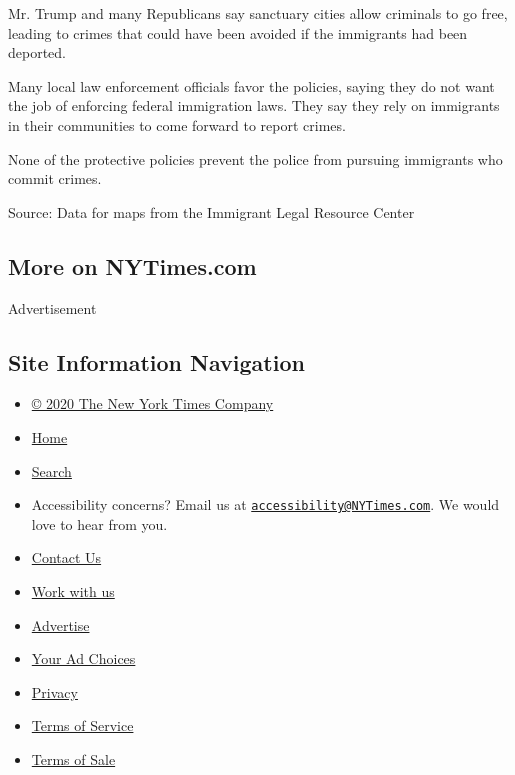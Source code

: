 Mr. Trump and many Republicans say sanctuary cities allow criminals to
go free, leading to crimes that could have been avoided if the
immigrants had been deported.

Many local law enforcement officials favor the policies, saying they do
not want the job of enforcing federal immigration laws. They say they
rely on immigrants in their communities to come forward to report
crimes.

None of the protective policies prevent the police from pursuing
immigrants who commit crimes.

Source: Data for maps from the Immigrant Legal Resource Center

\hypertarget{more-on-nytimescom}{%
\subsection{More on NYTimes.com}\label{more-on-nytimescom}}

Advertisement

\hypertarget{site-information-navigation}{%
\subsection{Site Information
Navigation}\label{site-information-navigation}}

\begin{itemize}
\tightlist
\item
  \href{https://help.nytimes3xbfgragh.onion/hc/en-us/articles/115014792127-Copyright-notice}{©
  2020 The New York Times Company}
\item
  \href{https://www.nytimes3xbfgragh.onion}{Home}
\item
  \href{https://www.nytimes3xbfgragh.onion/search/}{Search}
\item
  Accessibility concerns? Email us at
  \href{mailto:accessibility@NYTimes.com}{\nolinkurl{accessibility@NYTimes.com}}.
  We would love to hear from you.
\item
  \href{https://help.nytimes3xbfgragh.onion/hc/en-us/articles/115015385887-Contact-Us}{Contact
  Us}
\item
  \href{https://www.nytco.com/careers/}{Work with us}
\item
  \href{https://nytmediakit.com/}{Advertise}
\item
  \href{https://help.nytimes3xbfgragh.onion/hc/en-us/articles/115014892108-Privacy-policy\#pp}{Your
  Ad Choices}
\item
  \href{https://help.nytimes3xbfgragh.onion/hc/en-us/articles/115014892108-Privacy-policy}{Privacy}
\item
  \href{https://help.nytimes3xbfgragh.onion/hc/en-us/articles/115014893428-Terms-of-service}{Terms
  of Service}
\item
  \href{https://help.nytimes3xbfgragh.onion/hc/en-us/articles/115014893968-Terms-of-sale}{Terms
  of Sale}
\end{itemize}

